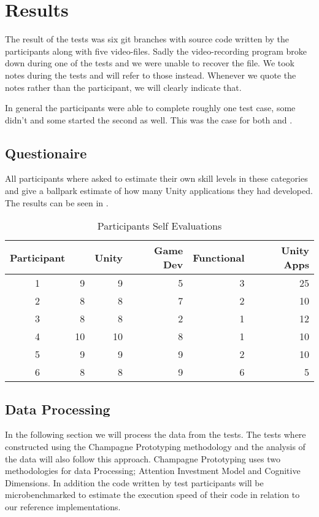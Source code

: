 \section{Results} \label{sec:test-results}
The result of the tests was six git branches with source code written by the participants along with five video-files. Sadly the video-recording program broke down during one of the tests and we were unable to recover the file. We took notes during the tests and will refer to those instead. Whenever we quote the notes rather than the participant, we will clearly indicate that.


In general the participants were able to complete roughly one test case, some didn't and some started the second as well. This was the case for both \fsh and \csh.

\subsection{Questionaire}
All participants where asked to estimate their own skill levels in these categories and give a ballpark estimate of how many Unity applications they had developed. The results can be seen in .

\begin{table}[H]
\begin{tabular}{| c | r | r | r | r | r |}
	\hline
	\textbf{Participant}&\textbf{\csh}&\textbf{Unity}&\textbf{Game Dev}&\textbf{Functional}&\textbf{Unity Apps} \\ \hline
	1 & 9 & 9 & 5 & 3 & 25 \\ \hline
	2 & 8 & 8 & 7 & 2 & 10 \\ \hline
	3 & 8 & 8 & 2 & 1 & 12 \\ \hline
	4 & 10 & 10 & 8 & 1 & 10 \\ \hline
	5 & 9 & 9 & 9 & 2 & 10 \\ \hline
	6 & 8 & 8 & 9 & 6 & 5 \\ \hline
\end{tabular}
\caption{Participants Self Evaluations}
\label{tab:participant-scores}
\end{table}

\subsection{Data Processing}
In the following section we will process the data from the tests. The tests where constructed using the Champagne Prototyping methodology and the analysis of the data will also follow this approach. Champagne Prototyping uses two methodologies for data Processing; Attention Investment Model and Cognitive Dimensions. In addition the code written by test participants will be microbenchmarked to estimate the execution speed of their code in relation to our reference implementations.

